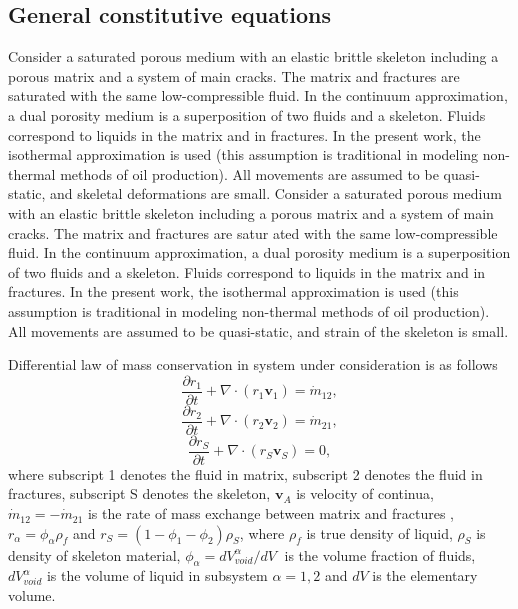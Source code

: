 \documentclass[article,authoryear,jpm]{beg_39}             %
\begin{document}
\subsection{General constitutive equations}
\label{sec:2}
Consider a saturated porous medium with an elastic brittle skeleton including a porous matrix and a system of main cracks. The matrix and fractures are saturated with the same low-compressible fluid. In the continuum approximation, a dual porosity medium is a superposition of two fluids and a skeleton. Fluids correspond to liquids in the matrix and in fractures. In the present work, the isothermal approximation is used (this assumption is traditional in modeling non-thermal methods of oil production). All movements are assumed to be quasi-static, and skeletal deformations are small.
Consider a saturated porous medium with an elastic brittle skeleton including a porous matrix and a system of main cracks. The matrix and fractures are satur ated with the same low-compressible fluid. In the continuum approximation, a dual porosity medium is a superposition of two fluids and a skeleton. Fluids correspond to liquids in the matrix and in fractures. In the present work, the isothermal approximation is used (this assumption is traditional in modeling non-thermal methods of oil production). All movements are assumed to be quasi-static, and strain of the skeleton is small.

Differential law of mass conservation in system under consideration is as follows
\begin{equation}
\frac{\partial {{r}_{1}}}{\partial t}+\nabla \cdot \left( {{r}_{1}}{{\mathbf{v}}_{1}} \right)={{\dot{m}}_{12}},
\end{equation}
\begin{equation}
\frac{\partial {{r}_{2}}}{\partial t}+\nabla \cdot \left( {{r}_{2}}{{\mathbf{v}}_{2}} \right)={{\dot{m}}_{21}},
\end{equation}
\begin{equation}
\frac{\partial {{r}_{S}}}{\partial t}+\nabla \cdot \left( {{r}_{S}}{{\mathbf{v}}_{S}} \right)=0,
\end{equation}
where subscript 1 denotes the fluid in matrix, subscript 2 denotes the fluid in fractures, subscript S denotes the skeleton, ${{\mathbf{v}}_{A}}$ is velocity of continua, ${{\dot{m}}_{12}}=-{{\dot{m}}_{21}}$ is the rate of mass exchange between matrix and fractures , ${{r}_{\alpha }}={{\phi }_{\alpha }}{{\rho }_{f}}$ and ${{r}_{S}}=(1-{{\phi }_{1}}-{{\phi }_{2}}){{\rho }_{S}}$, where ${{\rho }_{f}}$ is true density of liquid, ${{\rho }_{S}}$ is density of skeleton material, ${{\phi }_{\alpha }}={dV_{void}^{\alpha }}/{dV}\;$ is the volume fraction of fluids, $dV_{void}^{\alpha }$ is the volume of liquid in subsystem $\alpha=1,2$ and $dV$ is the elementary volume.
\end{document}
